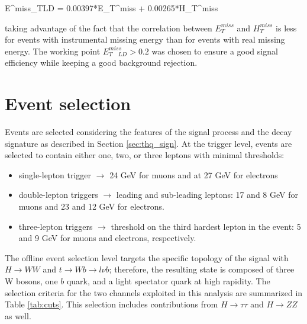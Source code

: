 \beqn
E^{miss}_{T\quad LD} = 0.00397*E_T^{miss} + 0.00265*H_T^{miss}
\eeqn

\noindent taking advantage of the fact that the correlation between $E_T^{miss}$ and  $H_T^{miss}$ is less for events with instrumental missing energy than for events with real missing energy. The working point $E^{miss}_{T\quad LD} > 0.2$ was chosen to ensure a good signal efficiency while keeping a good background rejection.

\section{Event selection}

Events are selected considering the features of the signal process and the decay signature as described in Section \ref{sec:thq_sign}. At the trigger level, events are selected to contain either one, two, or three leptons with minimal \pt thresholds:
\begin{itemize}
\item single-lepton trigger $\to$ 24 GeV for muons and at 27 GeV for electrons
\item double-lepton triggers $\to$ leading and sub-leading leptons: 17 and 8 GeV for muons and 23 and 12 GeV for electrons.
\item three-lepton triggers $\to$ threshold on the third hardest lepton in the event: 5 and 9 GeV for muons and electrons, respectively.
\end{itemize}

The offline event selection level targets the specific topology of the \tHq signal with $H\to WW$ and $t \to Wb \to l\nu b$; therefore, the resulting state is composed of three W bosons, one $b$ quark, and a light spectator quark at high rapidity. The selection criteria for the two channels exploited in this analysis are summarized in Table \ref{tab:cuts}. This selection includes contributions from $H \to \tau\tau$ and $H\to ZZ$ as well.

